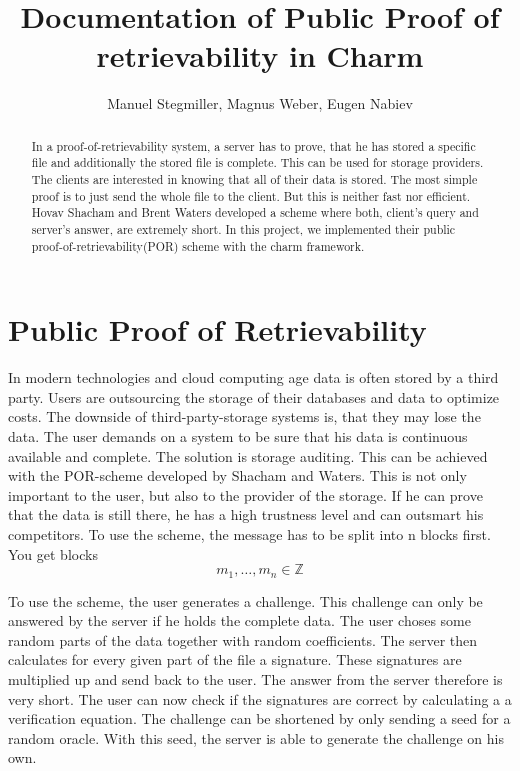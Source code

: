 \documentclass{amsart}
\title{Documentation of Public Proof of retrievability in Charm}
\author{Manuel Stegmiller, Magnus Weber, Eugen Nabiev}
\begin{document}
\begin{abstract}
In a proof-of-retrievability system, a server has to prove, that he has stored a specific file and additionally the stored file is complete. This can be used for storage providers. The clients are interested in knowing that all of their data is stored. The most simple proof is to just send the whole file to the client. But this is neither fast nor efficient. Hovav Shacham and Brent Waters developed a scheme where both, client's query and server's answer, are extremely short. In this project, we implemented their public proof-of-retrievability(POR) scheme with the charm framework.
\end{abstract}
\maketitle
\section{Public Proof of Retrievability}
In modern technologies and cloud computing age data is often stored by a third party. Users are outsourcing the storage of their databases and data to optimize costs. The downside of third-party-storage systems is, that they may lose the data. The user demands on a system to be sure that his data is continuous available and complete. The solution is storage auditing. This can be achieved with the POR-scheme developed by Shacham and Waters. This is not only important to the user, but also to the provider of the storage. If he can prove that the data is still there, he has a high trustness level and can outsmart his competitors.
To use the scheme, the message has to be split into n blocks first. You get blocks 
\begin{equation}
m_{1}, \dots , m_{n} \in \mathbb{Z} 
\end{equation}


To use the scheme, the user generates a challenge. This challenge can only be answered by the server if he holds the complete data. The user choses some random parts of the data together with random coefficients. The server then calculates for every given part of the file a signature. These signatures are multiplied up and send back to the user. The answer from the server therefore is very short. The user can now check if the signatures are correct by calculating a a verification equation. The challenge can be shortened by only sending a seed for a random oracle. With this seed, the server is able to generate the challenge on his own.
\end{document}

